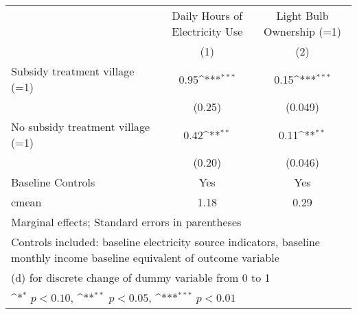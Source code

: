 \def\sym#1{\ifmmode^{#1}\else\(^{#1}\)\fi}
\begin{adjustbox}{max
width={\textwidth},caption={Endline electricity and bulb outcomes},nofloat=table}
\begin{tabular}{l*{2}{c}}
\toprule
& \shortstack{Daily Hours of\\Electricity Use} & \shortstack{Light Bulb\\Ownership (=1)} \\
& (1) & (2) \\ \hline
Subsidy treatment village (=1)&     0.95\sym{***}&     0.15\sym{***}\\
                &   (0.25)         &  (0.049)         \\
No subsidy treatment village (=1)&     0.42\sym{**} &     0.11\sym{**} \\
                &   (0.20)         &  (0.046)         \\
Baseline Controls &      Yes         &      Yes         \\
\midrule
cmean           &     1.18         &     0.29         \\
\bottomrule
\multicolumn{3}{p{\textwidth}}{\centering \footnotesize Marginal effects; Standard errors in parentheses}\\
\multicolumn{3}{p{\textwidth}}{\centering \footnotesize Controls included: baseline electricity source indicators, baseline monthly income baseline equivalent of outcome variable}\\
\multicolumn{3}{p{\textwidth}}{\centering \footnotesize  (d) for discrete change of dummy variable from 0 to 1}\\
\multicolumn{3}{p{\textwidth}}{\centering \footnotesize \sym{*} \(p<0.10\), \sym{**} \(p<0.05\), \sym{***} \(p<0.01\)}\\
\end{tabular}\end{adjustbox}
